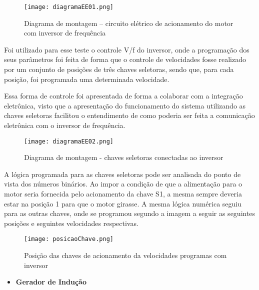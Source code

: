 		\newpage
		\begin{figure}[!h]
			\centering
			\texttt{[image: diagramaEE01.png]}
			\caption{Diagrama de montagem – circuito elétrico de acionamento do motor com inversor de frequência} 
			\label{diagramaEE01}
		\end{figure}

		Foi utilizado para esse teste o controle V/f do inversor, onde a programação dos seus parâmetros foi feita de forma que o controle de velocidades fosse realizado por um conjunto de posições de três chaves seletoras, sendo que, para cada posição, foi programada uma determinada velocidade. 

		Essa forma de controle foi apresentada de forma a colaborar com a integração eletrônica, visto que a apresentação do funcionamento do sistema utilizando as chaves seletoras facilitou o entendimento de como poderia ser feita a comunicação eletrônica com o inversor de frequência.

		\newpage
		\begin{figure}[!h]
			\centering
			\texttt{[image: diagramaEE02.png]}
			\caption[Diagrama de montagem - chaves seletoras conectadas ao inversor]{Diagrama de montagem - chaves seletoras conectadas ao inversor \cite{WEGIF}} 
			\label{diagramaEE02}
		\end{figure}

		A lógica programada para as chaves seletoras pode ser analisada do ponto de vista dos números binários. Ao impor a condição de que a alimentação para o motor seria fornecida pelo acionamento da chave S1, a mesma sempre deveria estar na posição 1 para que o motor girasse. A mesma lógica numérica seguiu para as outras chaves, onde se programou segundo a imagem a seguir as seguintes posições e seguintes velocidades respectivas.

		\begin{figure}[!h]
			\centering
			\texttt{[image: posicaoChave.png]}
			\caption[Posição das chaves de acionamento da velocidades programas com inversor]{Posição das chaves de acionamento da velocidades programas com inversor} 
			\label{posicaoChave}
		\end{figure}


		\begin{itemize}
		\item \textbf{Gerador de Indução}
		\end{itemize}

